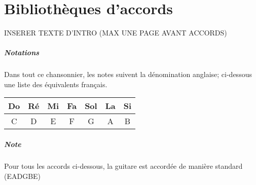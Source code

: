 \documentclass[a5paper]{scrbook}
\begin{document}
\chapter*{Bibliothèques d'accords}
INSERER TEXTE D'INTRO (MAX UNE PAGE AVANT ACCORDS)
\paragraph{Notations} Dans tout ce chansonnier, les notes suivent la dénomination anglaise; ci-dessous une liste des équivalents français.
\newline\newline
\begin{tabular}{||c||c||c||c||c||c||c||}
    \hline
    Do & Ré & Mi & Fa & Sol & La & Si\\
    \hline
    C & D & E & F & G & A & B\\
    \hline
\end{tabular}
\paragraph{Note} Pour tous les accords ci-dessous, la guitare est accordée de manière standard (EADGBE)

\newpage
\usebox{\A}
\usebox{\Aalt}
\usebox{\Am}
\usebox{\Amalt}
\usebox{\Afive}
\usebox{\Aseven}
\usebox{\Asevenalt}
\usebox{\Amajseven}
\usebox{\Amajsevenalt}
\usebox{\Amseven}
\usebox{\Amsevenalt}
\usebox{\Asusfour}
\usebox{\Asusfouralt}

\usebox{\B}
\usebox{\Bm}
\usebox{\Bseven}
\usebox{\Bsevenalt}
\usebox{\Bmajseven}
\usebox{\Bmseven}
\usebox{\Bsusfour}
\usebox{\Bsustwo}
\usebox{\Bsevensusfour}
\end{document}
